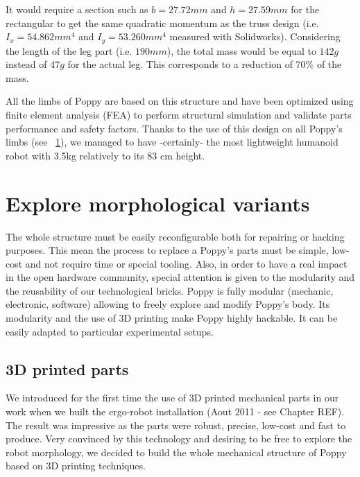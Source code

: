 It would require a section such as $b=27.72 mm$ and $h=27.59 mm$ for the rectangular to get the same quadratic momentum as the truss design (i.e. $I_x = 54.862 mm^4$ and $I_y = 53.260 mm^4$ measured with Solidworks).
Considering the length of the leg part (i.e. $190 mm$), the total mass would be equal to $142 g$ instead of $47 g$ for the actual leg. This corresponds to a reduction of 70\% of the mass.

\begin{figure}[!h]
\centering


    \caption{}
    \label{fig:poppy_truss_structure}
\end{figure}

All the limbs of Poppy are based on this structure and have been optimized using finite element analysis (FEA) to perform structural simulation and validate parts performance and safety factors.
Thanks to the use of this design on all Poppy's limbs (see \figurename~\ref{fig:poppy_truss_structure}), we managed to have -certainly- the most lightweight humanoid robot with 3.5kg relatively to its 83 cm height.



\section{Explore morphological variants} %

The whole structure must be easily reconfigurable both for repairing or hacking purposes. This mean the process to replace a Poppy's parts must be simple, low-cost and not require time or special tooling. Also, in order to have a real impact in the open hardware community, special attention is given to the modularity and the reusability of our technological bricks.
Poppy is fully modular (mechanic, electronic, software) allowing to freely explore and modify Poppy's body.
Its modularity and the use of 3D printing make Poppy highly hackable. It can be easily adapted to particular experimental setups.


\subsection{3D printed parts} %

We introduced for the first time the use of 3D printed mechanical parts in our work when we built the ergo-robot installation (Aout 2011 - see Chapter REF). The result was impressive as the parts were robust, precise, low-cost and fast to produce. Very convinced by this technology and desiring to be free to explore the robot morphology, we decided to build the whole mechanical structure of Poppy based on 3D printing techniques.

